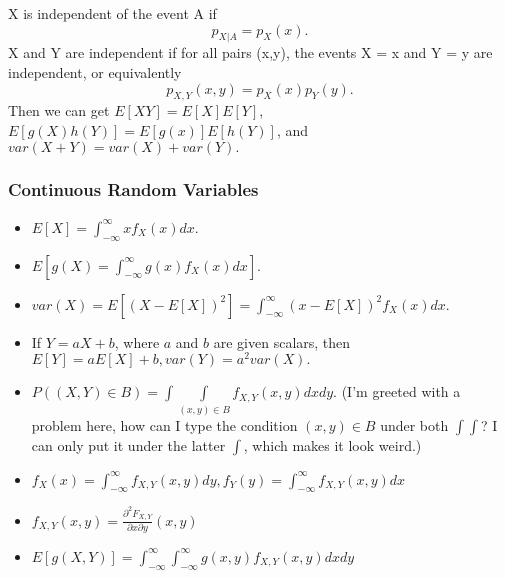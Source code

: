 \documentclass{article}
\begin{document}
X is independent of the event A if \[p_{X|A} = p_X(x).\]X and Y are independent if for all pairs (x,y), the events {X = x} and {Y = y} are independent, or equivalently \[p_{X,Y}(x,y) = p_X(x)p_Y(y).\]Then we can get $E[XY] = E[X]E[Y]$, $E[g(X)h(Y)] = E[g(x)]E[h(Y)]$, and $var(X + Y) = var(X) + var(Y).$
\subsubsection{Continuous Random Variables}
\begin{itemize}
\item

$E[X] = \int_{-\infty}^{\infty}xf_X(x)dx.$
\item

$E[g(X) = \int_{-\infty}^{\infty}g(x)f_X(x)dx].$
\item

$var(X) = E[(X - E[X])^2] = \int_{-\infty}^{\infty}(x - E[X])^2f_X(x)dx.$
\item

If $Y = aX + b$, where $a$ and $b$ are given scalars, then $E[Y] = aE[X] + b, var(Y) = a^2var(X).$
\end{itemize}


\begin{itemize}
\item

$P((X,Y)\in B) = \int\!\!\!\int\limits_{(x,y)\in B} f_{X,Y}(x,y)dx dy.$ (I'm greeted with a problem here, how can I type the condition $(x,y)\in B$ under both $\int\!\!\!\int$? I can only put it under the latter $\int$, which makes it look weird.)
\item

$f_X(x) = \int_{-\infty}^{\infty}f_{X,Y}(x,y)dy, f_Y(y) = \int_{-\infty}^{\infty}f_{X,Y}(x,y)dx$
\item

$f_{X,Y}(x,y) = \frac{\partial^2F_{X,Y}}{\partial x\partial y}(x,y)$
\item

$E[g(X,Y)] = \int_{-\infty}^{\infty}\int_{-\infty}^{\infty}g(x,y)f_{X,Y}(x,y)dx dy$
\end{itemize}

\end{document}
